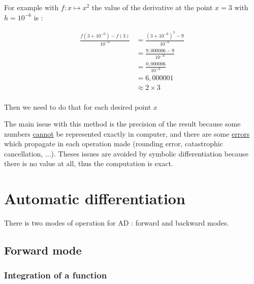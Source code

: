 \documentclass[12pt]{article}
\begin{document}
For example with $f: x \mapsto x^2$ the value of the derivative at the point $x=3$ with $h=10^{-6}$ is :

\begin{equation*}
    \begin{split}
        \frac{f(3+10^{-6})-f(3)}{10^{-6}} &= \frac{(3+10^{-6})^2 - 9}{10^{-6}}\\
            &= \frac{9,000006 - 9}{10^{-6}}\\
            &= \frac{0,000006}{10^{-6}}\\
            &= 6,000001 \\
            &\approx 2 \times 3 \\
    \end{split}
\end{equation*}

Then we need to do that for each desired point $x$

The main issue with this method is the precision of the result because some numbers \href{https://math.stackexchange.com/questions/943589/how-many-numbers-can-a-typical-computer-represent}{cannot} be represented exactly in computer, and there are some \href{https://docs.oracle.com/cd/E19957-01/806-3568/ncg_goldberg.html}{errors} which propagate in each operation made (rounding error, catastrophic cancellation, ...).
Theses issues are avoided by symbolic differentiation because there is no value at all, thus the computation is exact.


%
%

\section{Automatic differentiation}

There is two modes of operation for AD : forward and backward modes.

\subsection{Forward mode}

\subsubsection{Integration of a function}
\end{document}
